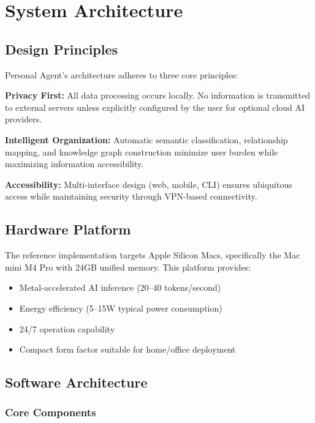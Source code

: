 \documentclass[11pt,letterpaper]{article}
\begin{document}
\section{System Architecture}

\subsection{Design Principles}

Personal Agent's architecture adheres to three core principles:

\textbf{Privacy First:} All data processing occurs locally. No information is transmitted to external servers unless explicitly configured by the user for optional cloud AI providers.

\textbf{Intelligent Organization:} Automatic semantic classification, relationship mapping, and knowledge graph construction minimize user burden while maximizing information accessibility.

\textbf{Accessibility:} Multi-interface design (web, mobile, CLI) ensures ubiquitous access while maintaining security through VPN-based connectivity.

\subsection{Hardware Platform}

The reference implementation targets Apple Silicon Macs, specifically the Mac mini M4 Pro with 24GB unified memory. This platform provides:

\begin{itemize}
\item Metal-accelerated AI inference (20--40 tokens/second)
\item Energy efficiency (5--15W typical power consumption)
\item 24/7 operation capability
\item Compact form factor suitable for home/office deployment
\end{itemize}

\subsection{Software Architecture}

\subsubsection{Core Components}
\end{document}
